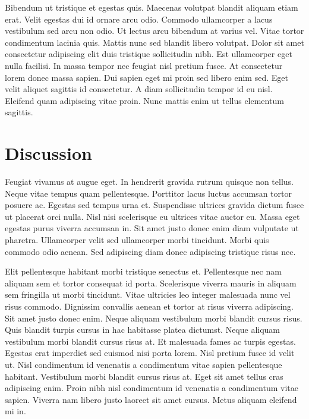 Bibendum ut tristique et egestas quis. Maecenas volutpat blandit aliquam
etiam erat. Velit egestas dui id ornare arcu odio. Commodo ullamcorper a
lacus vestibulum sed arcu non odio. Ut lectus arcu bibendum at varius
vel. Vitae tortor condimentum lacinia quis. Mattis nunc sed blandit
libero volutpat. Dolor sit amet consectetur adipiscing elit duis
tristique sollicitudin nibh. Est ullamcorper eget nulla facilisi. In
massa tempor nec feugiat nisl pretium fusce. At consectetur lorem donec
massa sapien. Dui sapien eget mi proin sed libero enim sed. Eget velit
aliquet sagittis id consectetur. A diam sollicitudin tempor id eu nisl.
Eleifend quam adipiscing vitae proin. Nunc mattis enim ut tellus
elementum sagittis.

\hypertarget{discussion}{%
\section{Discussion}\label{discussion}}

Feugiat vivamus at augue eget. In hendrerit gravida rutrum quisque non
tellus. Neque vitae tempus quam pellentesque. Porttitor lacus luctus
accumsan tortor posuere ac. Egestas sed tempus urna et. Suspendisse
ultrices gravida dictum fusce ut placerat orci nulla. Nisl nisi
scelerisque eu ultrices vitae auctor eu. Massa eget egestas purus
viverra accumsan in. Sit amet justo donec enim diam vulputate ut
pharetra. Ullamcorper velit sed ullamcorper morbi tincidunt. Morbi quis
commodo odio aenean. Sed adipiscing diam donec adipiscing tristique
risus nec.

Elit pellentesque habitant morbi tristique senectus et. Pellentesque nec
nam aliquam sem et tortor consequat id porta. Scelerisque viverra mauris
in aliquam sem fringilla ut morbi tincidunt. Vitae ultricies leo integer
malesuada nunc vel risus commodo. Dignissim convallis aenean et tortor
at risus viverra adipiscing. Sit amet justo donec enim. Neque aliquam
vestibulum morbi blandit cursus risus. Quis blandit turpis cursus in hac
habitasse platea dictumst. Neque aliquam vestibulum morbi blandit cursus
risus at. Et malesuada fames ac turpis egestas. Egestas erat imperdiet
sed euismod nisi porta lorem. Nisl pretium fusce id velit ut. Nisl
condimentum id venenatis a condimentum vitae sapien pellentesque
habitant. Vestibulum morbi blandit cursus risus at. Eget sit amet tellus
cras adipiscing enim. Proin nibh nisl condimentum id venenatis a
condimentum vitae sapien. Viverra nam libero justo laoreet sit amet
cursus. Metus aliquam eleifend mi in.

